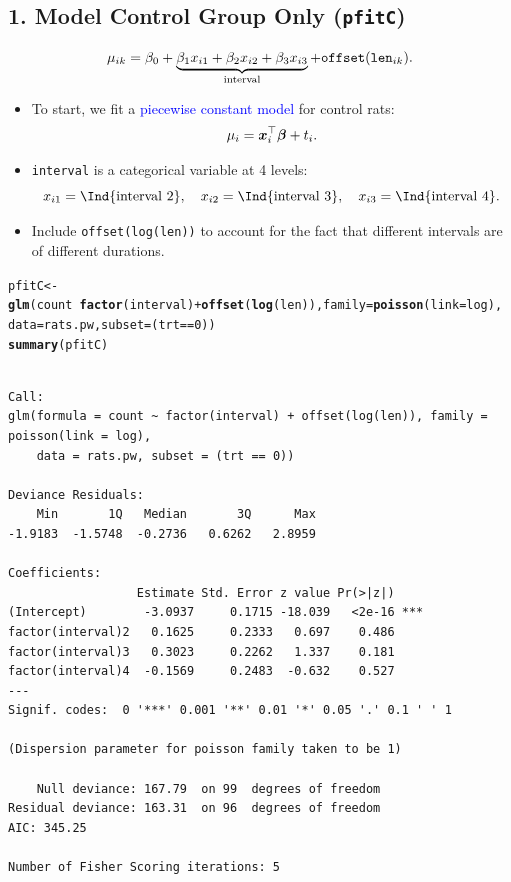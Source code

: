 \documentclass{article}\usepackage[]{graphicx}\usepackage[svgnames]{xcolor}
\makeatletter
\newcommand{\hlnum}[1]{\textcolor[rgb]{0.686,0.059,0.569}{#1}}%
\newcommand{\hlopt}[1]{\textcolor[rgb]{0,0,0}{#1}}%
\newcommand{\hlstd}[1]{\textcolor[rgb]{0.345,0.345,0.345}{#1}}%
\newcommand{\hlkwb}[1]{\textcolor[rgb]{0.69,0.353,0.396}{#1}}%
\newcommand{\hlkwc}[1]{\textcolor[rgb]{0.333,0.667,0.333}{#1}}%
\newcommand{\hlkwd}[1]{\textcolor[rgb]{0.737,0.353,0.396}{\textbf{#1}}}%
\newenvironment{kframe}{%
 \def\at@end@of@kframe{}%
 \ifinner\ifhmode%
  \def\at@end@of@kframe{\end{minipage}}%
  \begin{minipage}{\columnwidth}%
 \fi\fi%
 \def\FrameCommand##1{\hskip\@totalleftmargin \hskip-\fboxsep
 \colorbox{shadecolor}{##1}\hskip-\fboxsep
     \hskip-\linewidth \hskip-\@totalleftmargin \hskip\columnwidth}%
 \MakeFramed {\advance\hsize-\width
   \@totalleftmargin\z@ \linewidth\hsize
   \@setminipage}}%
 {\par\unskip\endMakeFramed%
 \at@end@of@kframe}
\newenvironment{knitrout}{}{} %
\let\log\relax%
\providecommand{\Vector}[1]{\bm{#1}}%
\makeatother
\begin{document}
\subsection*{1. Model Control Group Only (\texttt{pfitC})}
\[ \log{\mu_{ik}}=\beta_0+\underbrace{\beta_1x_{i1}+\beta_2x_{i2}+\beta_3x_{i3}}_{\text{interval}}+\texttt{offset}(\log{\texttt{len}_{ik}}). \]
\begin{itemize}
    \item To start, we fit a \textcolor{Blue}{piecewise constant model} for control rats:
          \[ \log{\mu_i}=\Vector{x}_i^\top \Vector{\beta}+\log{t_i}. \]
    \item \texttt{interval} is a categorical variable at 4 levels:
          \[ x_{i1}=\Ind{\text{interval 2}},\quad x_{i2}=\Ind{\text{interval 3}},\quad x_{i3}=\Ind{\text{interval 4}}. \]
    \item Include \texttt{offset(log(len))} to account for the fact that different intervals are of
          different durations.
\end{itemize}
\begin{knitrout}
\color{fgcolor}\begin{kframe}
\begin{alltt}
\hlstd{pfitC} \hlkwb{<-} \hlkwd{glm}\hlstd{(count} \hlopt{~} \hlkwd{factor}\hlstd{(interval)} \hlopt{+} \hlkwd{offset}\hlstd{(}\hlkwd{log}\hlstd{(len)),} \hlkwc{family} \hlstd{=} \hlkwd{poisson}\hlstd{(}\hlkwc{link} \hlstd{= log),}
  \hlkwc{data} \hlstd{= rats.pw,} \hlkwc{subset} \hlstd{= (trt} \hlopt{==} \hlnum{0}\hlstd{))}
\hlkwd{summary}\hlstd{(pfitC)}
\end{alltt}
\begin{verbatim}

Call:
glm(formula = count ~ factor(interval) + offset(log(len)), family = poisson(link = log), 
    data = rats.pw, subset = (trt == 0))

Deviance Residuals: 
    Min       1Q   Median       3Q      Max  
-1.9183  -1.5748  -0.2736   0.6262   2.8959  

Coefficients:
                  Estimate Std. Error z value Pr(>|z|)    
(Intercept)        -3.0937     0.1715 -18.039   <2e-16 ***
factor(interval)2   0.1625     0.2333   0.697    0.486    
factor(interval)3   0.3023     0.2262   1.337    0.181    
factor(interval)4  -0.1569     0.2483  -0.632    0.527    
---
Signif. codes:  0 '***' 0.001 '**' 0.01 '*' 0.05 '.' 0.1 ' ' 1

(Dispersion parameter for poisson family taken to be 1)

    Null deviance: 167.79  on 99  degrees of freedom
Residual deviance: 163.31  on 96  degrees of freedom
AIC: 345.25

Number of Fisher Scoring iterations: 5
\end{verbatim}
\end{kframe}
\end{knitrout}
\end{document}
